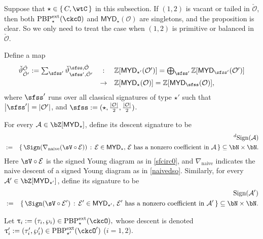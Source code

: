 \documentclass[11pt,a4paper]{amsart}
\def\MYD{{\mathsf{MYD}}}
\def\abs#1{\left|{#1}\right|}
\newcommand{\CA}{{\mathcal {A}}}
\newcommand{\CE}{{\mathcal {E}}}
\newcommand{\CO}{{\mathcal {O}}}
\newcommand{\Z}{\mathbb{Z}}
\newcommand{\be}{\begin {equation}}
\newcommand{\ee}{\end {equation}}
\numberwithin{equation}{section}
\theoremstyle{remark}
\def\subset{\subseteq}
\def\PBPes{\mathrm{PBP}^{\mathrm{ext}}_{\star}}
\def\PBPesp{\mathrm{PBP}^{\mathrm{ext}}_{\star'}}
\def\ckcOp{\ckcO^{\prime}}
\def\MYD{{\mathsf{MYD}}}
\begin{document}
Suppose that $\star\in \set{C,\wtC}$ in this subsection. 
If $(1,2)$ is vacant or tailed in $\check \CO$, then both $\PBPes(\ckcO)$ and $\MYD_\star(\CO)$ are singletons, and the proposition is clear. So we only need to treat the case when  $(1,2)$ is primitive  or balanced in $\check \CO$.


Define a map
\be\label{thetaoop}
\begin{array}{rcl}
\check{\vartheta}_{\check \CO'}^{\check \CO}:=\sum_{\sfss'} \check{\vartheta}_{\sfss',\check \CO'}^{\sfss, \check \CO} & : & \Z[\MYD_{\star'}(\CO')]=
  \bigoplus_{\sfss'}
  \Z[\MYD_{\sfss'}(\CO')] \smallskip\\
  &\rightarrow& \Z[\MYD_{\star}(\CO)]=\Z[\MYD_{\sfss}(\CO)],
  \end{array}
  \ee
  where $\sfss'$ runs over all  classical signatures of type $\star'$ such that $\abs{\sfss'}=\abs{\CO'}$, and $\sfss:=(\star, \frac{|\CO|}{2}, \frac{|\CO|}{2})$. 
  
For every $\CA\in \bZ[\MYD_{\star}] $, define its  descent signature to be 
\begin{eqnarray*}
  && \dsign(\CA) \\
  &:=& \set{\Sign(\nabla_{\textrm{naive}}(\sV\circ \CE))\,:\, \CE\in \MYD_\star, \,\textrm{$\CE$ has a nonzero coefficient in $\CA$} }\subset \bN\times \bN.
\end{eqnarray*}
Here $\sV\circ \CE$ is the signed Young diagram as in \eqref{sfcirc0}, and $\nabla_{\textrm{naive}}$ indicates the naive descent of a signed Young diagram as in \eqref{naivedso}. Similarly, for every $\CA'\in \bZ[\MYD_{\star'}] $, define its   signature to be 
\begin{eqnarray*}
  && \sign{\CA'} \\
  &:=& \set{\Sign(\sV\circ \CE') \,:\, \CE'\in \MYD_{\star'}, \,\textrm{$\CE'$ has a nonzero coefficient in $\CA'$} }\subset \bN\times \bN.
\end{eqnarray*}



Let 
$ \uptau_i:=(\tau_i, \wp_i)\in \PBPes(\ckcO),
$
whose descent is denoted 
$ \uptau'_i:=(\tau'_i, \wp'_i)\in \PBPesp(\ckcOp)$ ($i=1,2$).

\medskip 
\end{document}
